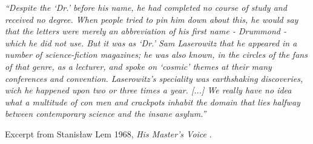\clearpage


\vspace*{\fill}


\noindent \textit{``Despite the `Dr.' before his name, he had completed no course of study and received no degree. When people tried to pin him down about this, he would say that the letters were merely an abbreviation of his first name - Drummond - which he did not use. But it was as `Dr.' Sam Laserowitz that he appeared in a number of science-fiction magazines; he was also known, in the circles of the fans of that genre, as a lecturer, and spoke on `cosmic' themes at their many conferences and convention. Laserowitz's speciality was earthshaking discoveries, wich he happened upon two or three times a year. [...] We really have no idea what a multitude of con men and crackpots inhabit the domain that lies halfway between contemporary science and the insane asylum.''}
\vspace{\baselineskip}

\noindent Excerpt from Stanis\l aw Lem 1968, \textit{His Master's Voice} \citep[p.~38]{Lem1984}.


\newpage


